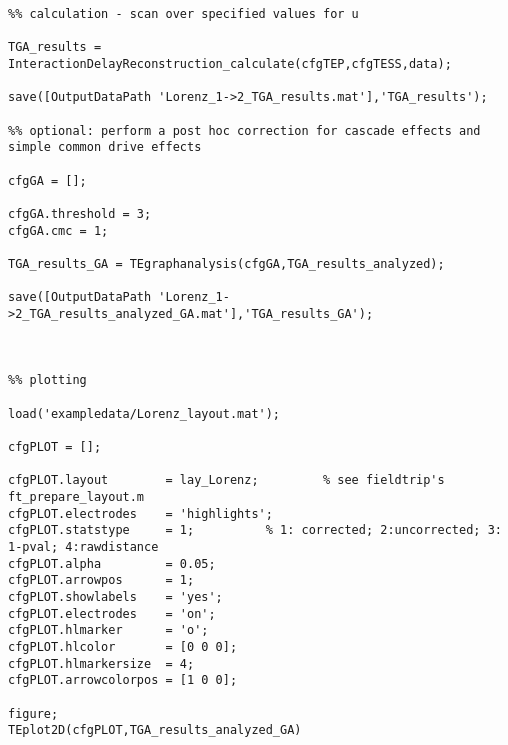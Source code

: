 \begin{lstlisting}
%% calculation - scan over specified values for u

TGA_results = InteractionDelayReconstruction_calculate(cfgTEP,cfgTESS,data);

save([OutputDataPath 'Lorenz_1->2_TGA_results.mat'],'TGA_results');

%% optional: perform a post hoc correction for cascade effects and simple common drive effects

cfgGA = [];

cfgGA.threshold = 3;
cfgGA.cmc = 1;

TGA_results_GA = TEgraphanalysis(cfgGA,TGA_results_analyzed);

save([OutputDataPath 'Lorenz_1->2_TGA_results_analyzed_GA.mat'],'TGA_results_GA');



%% plotting

load('exampledata/Lorenz_layout.mat');

cfgPLOT = [];

cfgPLOT.layout        = lay_Lorenz; 		% see fieldtrip's ft_prepare_layout.m
cfgPLOT.electrodes    = 'highlights';
cfgPLOT.statstype     = 1;   		% 1: corrected; 2:uncorrected; 3: 1-pval; 4:rawdistance
cfgPLOT.alpha         = 0.05;
cfgPLOT.arrowpos      = 1;
cfgPLOT.showlabels    = 'yes';
cfgPLOT.electrodes    = 'on';
cfgPLOT.hlmarker      = 'o';
cfgPLOT.hlcolor       = [0 0 0];
cfgPLOT.hlmarkersize  = 4;
cfgPLOT.arrowcolorpos = [1 0 0];

figure; 
TEplot2D(cfgPLOT,TGA_results_analyzed_GA)
\end{lstlisting}


